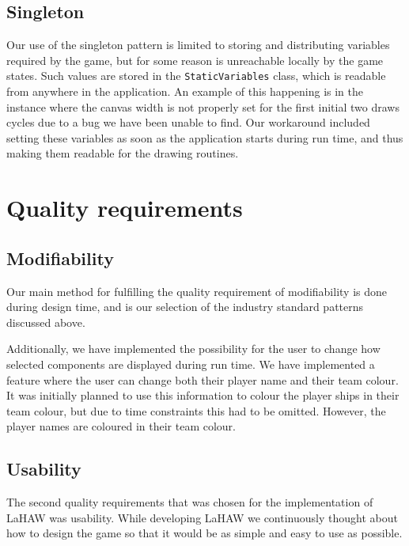 \subsection{Singleton}


Our use of the singleton pattern is limited to storing and distributing variables required by the game, but for some reason is unreachable locally by the game states. Such values are stored in the \texttt{StaticVariables} class, which is readable from anywhere in the application.
An example of this happening is in the instance where the canvas width is not properly set for the first initial two draws cycles due to a bug we have been unable to find. Our workaround included setting these variables as soon as the application starts during run time, and thus making them readable for the drawing routines.





\section{Quality requirements}

\subsection{Modifiability}
Our main method for fulfilling the quality requirement of modifiability is done during design time, and is our selection of the industry standard patterns discussed above.


Additionally, we have implemented the possibility for the user to change how selected components are displayed during run time.
We have implemented a feature where the user can change both their player name and their team colour. It was initially planned to use this information to colour the player ships in their team colour, but due to time constraints this had to be omitted. However, the player names are coloured in their team colour.



\subsection{Usability}
The second quality requirements that was chosen for the implementation of LaHAW was usability. While developing LaHAW we continuously thought about how to design the game so that it would be as simple and easy to use as possible.

